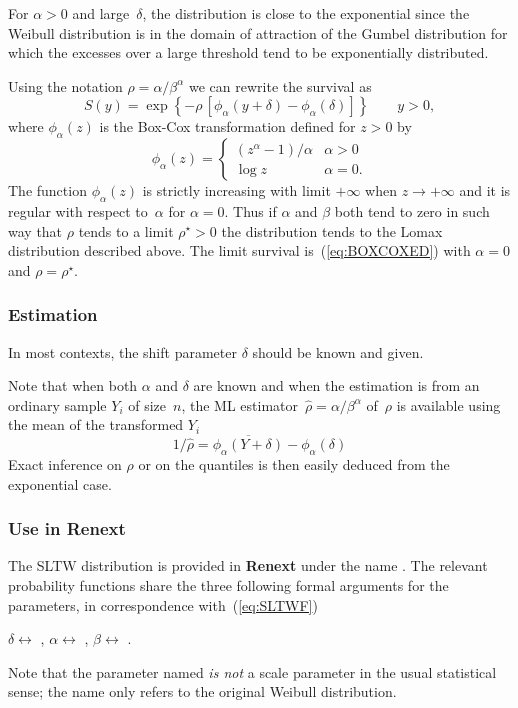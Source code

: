 \documentclass[a4paper]{report}
\newcommand{\pkg}[1]{\textbf{#1}}
\begin{document}
For $\alpha>0$ and large~$\delta$, the 
distribution is close to the exponential since the Weibull distribution
is in the domain of attraction of the Gumbel distribution for which the 
excesses over a large threshold tend to be exponentially distributed.

Using the notation $\rho = \alpha/\beta^\alpha$ we can
rewrite the survival as
\begin{equation}
    \label{eq:BOXCOXED}
    S(y) = 
    \exp \left\{ - \rho\, \left[ 
        \phi_\alpha(y + \delta)
          -\phi_\alpha (\delta)  
        \right] \right\} \qquad y > 0, 
\end{equation}
where $\phi_\alpha(z)$ is the Box-Cox transformation defined for $z>0$ by
\begin{equation}
  \label{eq:BOXCOXdef}
   \phi_\alpha(z) = 
   \begin{cases} 
     (z^\alpha - 1)/\alpha & \alpha > 0\\
     \log z                & \alpha = 0. 
   \end{cases}
\end{equation}
The function $\phi_\alpha(z)$ is strictly increasing with limit $+\infty$ when 
$z \rightarrow +\infty$ and it is regular with respect 
to~$\alpha$ for $\alpha=0$.
Thus if $\alpha$ and $\beta$ both
tend to zero in such way that $\rho$ tends to a limit $\rho^\star>0$ the
distribution tends to the Lomax distribution described above. The
limit survival is~(\ref{eq:BOXCOXED}) with $\alpha=0$ and 
$\rho=\rho^\star$.


\subsubsection*{Estimation}
In most contexts, the shift parameter $\delta$ should be known and given. 

Note that when  both $\alpha$ and $\delta$ are known and
when the estimation is from an ordinary sample $Y_i$ of size~$n$,
the ML estimator~$\widehat{\rho} = \alpha/\beta^\alpha$ of~$\rho$ is available 
using the mean of the transformed $Y_i$
$$ 
    1/\widehat{\rho} = \overline{\phi_\alpha(Y+\delta)}-\phi_\alpha(\delta)
$$ 
Exact inference on $\rho$ or on the quantiles is then easily deduced from the exponential case.

\subsubsection*{Use in Renext}
The SLTW distribution is provided in \pkg{Renext} under the name \verb@SLTW@.
The relevant probability functions share the three following formal 
arguments for the parameters, in correspondence with~(\ref{eq:SLTWF})
\begin{center}
  $\delta \leftrightarrow$ \verb@delta@, \qquad
  $\alpha \leftrightarrow$ \verb@shape@, \qquad
  $\beta \leftrightarrow$ \verb@scale@. 
\end{center}
Note that the parameter named \verb@scale@ \textit{is not} a scale parameter in the 
usual statistical sense; the name only refers to the original Weibull distribution.
\end{document}
